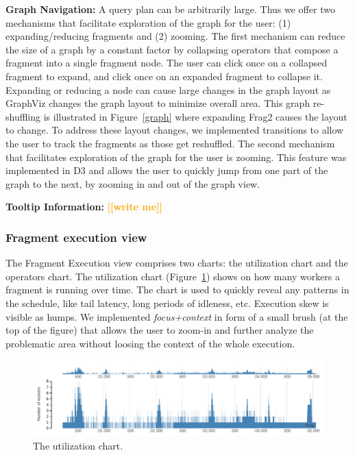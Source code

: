 \documentclass{chi2009}
\newcommand*{\fragment}{Fragment Execution\xspace}
\newcommand{\todo}[1]{\textsf{\textbf{\textcolor{Orange}{[[#1]]}}}}
\begin{document}
\textbf{Graph Navigation:} A query plan can be arbitrarily large. Thus we offer two mechanisms that facilitate exploration of the graph for the user: (1) expanding/reducing fragments and (2) zooming. The first mechanism can reduce the size of a graph by a constant factor by collapsing operators that compose a fragment into a single fragment node. The user can click once on a collapsed fragment to expand, and click once on an expanded fragment to collapse it. Expanding or reducing a node can cause large changes in the graph layout as GraphViz changes the graph layout to minimize overall area. This graph re-shuffling is illustrated in Figure~\ref{graph} where expanding Frag2 causes the layout to change. To address these layout changes, we implemented transitions to allow the user to track the fragments as those get reshuffled. The second mechanism that facilitates exploration of the graph for the user is zooming. This feature was implemented in D3 and allows the user to quickly jump from one part of the graph to the next, by zooming in and out of the graph view.

\textbf{Tooltip Information:} \todo{write me}


\subsubsection{Fragment execution view}
\label{sec:fragment}


The \fragment view comprises two charts: the utilization chart and the
operators chart. The utilization chart (Figure~\ref{fig:utilization_chart}) shows on
how many workers a fragment is running over time. The chart is used to
quickly reveal any patterns in the schedule, like tail latency, long periods of
idleness, etc. Execution skew is visible as humps.
We implemented \emph{focus+context}\cite{furnas1986generalized} in form of
a small brush (at the top of the figure) that allows the user to zoom-in and further
analyze the problematic area without loosing the context of the whole execution.

\begin{figure}[ht]
  \includegraphics[width=\columnwidth]{images/utilization_chart}
  \caption{The utilization chart.}
  \label{fig:utilization_chart}
\end{figure}
\end{document}
